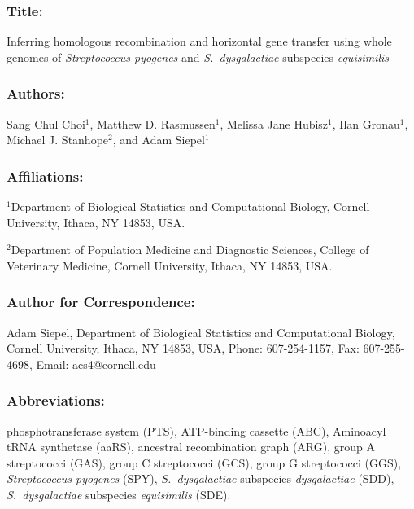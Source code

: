 \documentclass[english]{article}
\newcommand{\lyxaddress}[1]{
\par {\raggedright #1
\vspace{1.4em}
\noindent\par}
}
\begin{document}
\renewcommand\refname{Literature Cited}

\raggedright 


\subsubsection*{Title: }

Inferring homologous recombination and horizontal gene transfer 
using whole genomes of \textit{Streptococcus pyogenes} 
and\textit{ S.\ dysgalactiae} subspecies \textit{equisimilis} 


\subsubsection*{Authors:}

Sang Chul Choi$^{1}$, Matthew D. Rasmussen$^{1}$, Melissa Jane Hubisz$^{1}$, Ilan 
Gronau$^{1}$,
Michael J. Stanhope$^{2}$, and Adam Siepel$^{1}$


\subsubsection*{Affiliations:}


\lyxaddress{$^{1}$Department of Biological Statistics and Computational Biology,
Cornell University, Ithaca, NY 14853, USA.}


\lyxaddress{$^{2}$Department of Population Medicine and Diagnostic Sciences,
College of Veterinary Medicine, Cornell University, Ithaca, NY 14853,
USA.}


\subsubsection*{Author for Correspondence:}

Adam Siepel, Department of Biological Statistics and Computational
Biology, Cornell University, Ithaca, NY 14853, USA, Phone: 607-254-1157,
Fax: 607-255-4698, Email: acs4@cornell.edu\clearpage{}


\subsubsection*{Abbreviations:}

phosphotransferase system (PTS), ATP-binding cassette (ABC), Aminoacyl
tRNA synthetase (aaRS), ancestral recombination graph (ARG), group
A streptococci (GAS), group C streptococci (GCS), group G streptococci
(GGS), \textit{Streptococcus pyogenes} (SPY), \textit{S.\ dysgalactiae}
subspecies \textit{dysgalactiae} (SDD), \textit{S.\ dysgalactiae} subspecies
\textit{equisimilis} (SDE).
\end{document}

